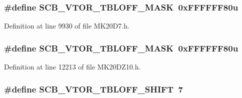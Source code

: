 \subsubsection[{\texorpdfstring{S\+C\+B\+\_\+\+V\+T\+O\+R\+\_\+\+T\+B\+L\+O\+F\+F\+\_\+\+M\+A\+SK}{SCB_VTOR_TBLOFF_MASK}}]{\setlength{\rightskip}{0pt plus 5cm}\#define S\+C\+B\+\_\+\+V\+T\+O\+R\+\_\+\+T\+B\+L\+O\+F\+F\+\_\+\+M\+A\+SK~0x\+F\+F\+F\+F\+F\+F80u}\hypertarget{group___s_c_b___register___masks_ga07fd57e90baff628af14394c8142dc27}{}\label{group___s_c_b___register___masks_ga07fd57e90baff628af14394c8142dc27}


Definition at line 9930 of file M\+K20\+D7.\+h.

\subsubsection[{\texorpdfstring{S\+C\+B\+\_\+\+V\+T\+O\+R\+\_\+\+T\+B\+L\+O\+F\+F\+\_\+\+M\+A\+SK}{SCB_VTOR_TBLOFF_MASK}}]{\setlength{\rightskip}{0pt plus 5cm}\#define S\+C\+B\+\_\+\+V\+T\+O\+R\+\_\+\+T\+B\+L\+O\+F\+F\+\_\+\+M\+A\+SK~0x\+F\+F\+F\+F\+F\+F80u}\hypertarget{group___s_c_b___register___masks_ga07fd57e90baff628af14394c8142dc27}{}\label{group___s_c_b___register___masks_ga07fd57e90baff628af14394c8142dc27}


Definition at line 12213 of file M\+K20\+D\+Z10.\+h.

\subsubsection[{\texorpdfstring{S\+C\+B\+\_\+\+V\+T\+O\+R\+\_\+\+T\+B\+L\+O\+F\+F\+\_\+\+S\+H\+I\+FT}{SCB_VTOR_TBLOFF_SHIFT}}]{\setlength{\rightskip}{0pt plus 5cm}\#define S\+C\+B\+\_\+\+V\+T\+O\+R\+\_\+\+T\+B\+L\+O\+F\+F\+\_\+\+S\+H\+I\+FT~7}\hypertarget{group___s_c_b___register___masks_gac6092f3c78a9f126c2d02740a7976708}{}\label{group___s_c_b___register___masks_gac6092f3c78a9f126c2d02740a7976708}



